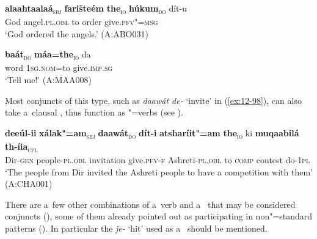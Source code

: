 \begin{exe}
\ex
\label{ex:12-96}
\gll {\ob}\textbf{alaahtaalaá}{\cb}\textsubscript{\textsc{\upshape sbj}} {\ob}\textbf{farišteém} \textbf{the}{\cb}\textsubscript{\textsc{\upshape io}} {\ob}\textbf{húkum}{\cb}\textsubscript{\textsc{\upshape do}} dít-u\\
God angel.\textsc{pl.obl} to order give.\textsc{pfv"=msg}\\
\glt `God ordered the angels.' (A:ABO031)
\end{exe}
\begin{exe}
\ex
\label{ex:12-97}
\gll {\ob}\textbf{baát}{\cb}\textsubscript{\textsc{\upshape do}} {\ob}\textbf{máa=the}{\cb}\textsubscript{\textsc{\upshape io}} da\\
word \textsc{1sg.nom=}to give.\textsc{imp.sg}\\
\glt `Tell me!' (A:MAA008)
\end{exe}

Most conjuncts of this type, such as \textit{daawát de-} `invite' in (\ref{ex:12-98}), can also take a~clausal , thus function as "=verbs (see ).

\ea
\label{ex:12-98}
\gll {\ob}\textbf{deeúl-ii} \textbf{xálak"=am}{\cb}\textsubscript{\textsc{\upshape sbj}} {\ob}\textbf{daawát}{\cb}\textsubscript{\textsc{\upshape do}} {\ob}\textbf{dít-i}{\cb} {\ob}\textbf{atsharíit"=am} \textbf{the}{\cb}\textsubscript{\textsc{\upshape io}} ki {\ob}\textbf{muqaabilá} \textbf{th-íia}{\cb}\textsubscript{\textsc{\upshape cpl}}\\
Dir-\textsc{gen} people-\textsc{pl.obl} invitation give.\textsc{pfv-f}  Ashreti-\textsc{pl.obl} to \textsc{comp} contest do-\textsc{1pl}\\
\glt `The people from Dir invited the Ashreti people to have a competition with them' (A:CHA001)
\z

 There are a~few other combinations of a~verb and a~ that may be considered conjuncts (), some of them already pointed out as participating in non"=standard  patterns (). In particular the  \textit{ǰe-} `hit' used as a~ should be mentioned.


